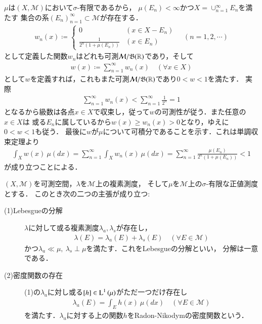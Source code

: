 	\begin{prf}
		$\mu$は$(X,\mathcal{M})$において$\sigma$-有限であるから，
		$\mu(E_n) < \infty$かつ$X = \cup_{n=1}^\infty E_n$を満たす
		集合の系$(E_n)_{n=1}^\infty \subset \mathcal{M}$が存在する．
		\begin{align}
			w_n(x) \coloneqq
			\begin{cases}
				0 & (x \in X - E_n) \\
				\frac{1}{2^n(1+\mu(E_n))} & (x \in E_n)
			\end{cases}
			\quad (n=1,2,\cdots)
		\end{align}
		として定義した関数$w_n$はどれも可測$\mathcal{M}/\mathfrak{B}(\mathbb{R})$であり，そして
		\begin{align}
			w(x) \coloneqq \sum_{n=1}^{\infty} w_n(x) \quad (\forall x \in X)
		\end{align}
		として$w$を定義すれば，これもまた可測$\mathcal{M}/\mathfrak{B}(\mathbb{R})$であり$0 < w < 1$を満たす．
		実際
		\begin{align}
			\sum_{n=1}^\infty w_n(x) < \sum_{n=1}^\infty \frac{1}{2^n} = 1
		\end{align}
		となるから級数は各点$x \in X$で収束し，従って$w$の可測性が従う．また任意の$x \in X$は
		或る$E_n$に属しているから$w(x) \geq w_n(x) > 0$となり，ゆえに$0 < w < 1$も従う．
		最後に$w$が$\mu$について可積分であることを示す．これは単調収束定理より
		\begin{align}
			\int_X w(x)\ \mu(dx) = \sum_{n=1}^{\infty} \int_X w_n(x)\ \mu(dx) = \sum_{n=1}^{\infty} \frac{\mu(E_n)}{2^n(1+\mu(E_n))} < 1
		\end{align}
		が成り立つことによる．
		\QED
	\end{prf}
	
	\begin{itembox}[l]{}
		\begin{thm}
			$(X,\mathcal{M})$を可測空間，$\lambda$を$\mathcal{M}$上の複素測度，
			そして$\mu$を$\mathcal{M}$上の$\sigma$-有限な正値測度とする．
			このとき次の二つの主張が成り立つ:
			\begin{description}
				\item[(1)Lebesgueの分解] $\lambda$に対して或る複素測度$\lambda_a,\lambda_s$が存在し，
					\begin{align}
						\lambda(E) = \lambda_a(E) + \lambda_s(E) \quad (\forall E \in \mathcal{M})
					\end{align}
					かつ$\lambda_a \ll \mu,\ \lambda_s \perp \mu$を満たす．これをLebesgueの分解といい，
					分解は一意である．
					
				\item[(2)密度関数の存在] (1)の$\lambda_a$に対し或る$[h] \in \operatorname{L}^{1} \left(\mu\right)$がただ一つだけ存在し
					\begin{align}
						\lambda_a(E) = \int_E h(x)\ \mu(dx) \quad (\forall E \in \mathcal{M})
					\end{align}
					を満たす．$\lambda_a$に対する上の関数$h$をRadon-Nikodymの密度関数という．
			\end{description}
		\end{thm}
	\end{itembox}
	
